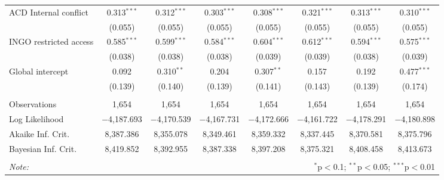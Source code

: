 \begin{sidewaystable}[!htbp]
\begin{tabular}{@{\extracolsep{5pt}}lccccccc}
  ACD Internal conflict & 0.313$^{***}$ & 0.312$^{***}$ & 0.303$^{***}$ & 0.308$^{***}$ & 0.321$^{***}$ & 0.313$^{***}$ & 0.310$^{***}$ \\ 
  & (0.055) & (0.055) & (0.055) & (0.055) & (0.055) & (0.055) & (0.055) \\ 
  INGO restricted access & 0.585$^{***}$ & 0.599$^{***}$ & 0.584$^{***}$ & 0.604$^{***}$ & 0.612$^{***}$ & 0.594$^{***}$ & 0.575$^{***}$ \\ 
  & (0.038) & (0.038) & (0.038) & (0.039) & (0.039) & (0.038) & (0.039) \\ 
  Global intercept & 0.092 & 0.310$^{**}$ & 0.204 & 0.307$^{**}$ & 0.157 & 0.192 & 0.477$^{***}$ \\ 
  & (0.139) & (0.140) & (0.139) & (0.141) & (0.143) & (0.139) & (0.174) \\ 
 \hline \\[-1.8ex] 
Observations & 1,654 & 1,654 & 1,654 & 1,654 & 1,654 & 1,654 & 1,654 \\ 
Log Likelihood & $-$4,187.693 & $-$4,170.539 & $-$4,167.731 & $-$4,172.666 & $-$4,161.722 & $-$4,178.291 & $-$4,180.898 \\ 
Akaike Inf. Crit. & 8,387.386 & 8,355.078 & 8,349.461 & 8,359.332 & 8,337.445 & 8,370.581 & 8,375.796 \\ 
Bayesian Inf. Crit. & 8,419.852 & 8,392.955 & 8,387.338 & 8,397.208 & 8,375.321 & 8,408.458 & 8,413.673 \\ 
\hline 
\hline \\[-1.8ex] 
\textit{Note:}  & \multicolumn{7}{r}{$^{*}$p$<$0.1; $^{**}$p$<$0.05; $^{***}$p$<$0.01} \\ 
\end{tabular} 
\end{sidewaystable} 
